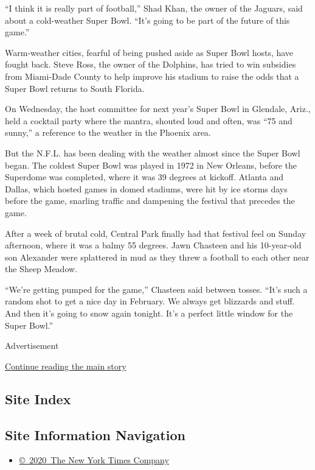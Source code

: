 ``I think it is really part of football,'' Shad Khan, the owner of the
Jaguars, said about a cold-weather Super Bowl. ``It's going to be part
of the future of this game.''

Warm-weather cities, fearful of being pushed aside as Super Bowl hosts,
have fought back. Steve Ross, the owner of the Dolphins, has tried to
win subsidies from Miami-Dade County to help improve his stadium to
raise the odds that a Super Bowl returns to South Florida.

On Wednesday, the host committee for next year's Super Bowl in Glendale,
Ariz., held a cocktail party where the mantra, shouted loud and often,
was ``75 and sunny,'' a reference to the weather in the Phoenix area.

But the N.F.L. has been dealing with the weather almost since the Super
Bowl began. The coldest Super Bowl was played in 1972 in New Orleans,
before the Superdome was completed, where it was 39 degrees at kickoff.
Atlanta and Dallas, which hosted games in domed stadiums, were hit by
ice storms days before the game, snarling traffic and dampening the
festival that precedes the game.

After a week of brutal cold, Central Park finally had that festival feel
on Sunday afternoon, where it was a balmy 55 degrees. Jawn Chasteen and
his 10-year-old son Alexander were splattered in mud as they threw a
football to each other near the Sheep Meadow.

``We're getting pumped for the game,'' Chasteen said between tosses.
``It's such a random shot to get a nice day in February. We always get
blizzards and stuff. And then it's going to snow again tonight. It's a
perfect little window for the Super Bowl.''

Advertisement

\protect\hyperlink{after-bottom}{Continue reading the main story}

\hypertarget{site-index}{%
\subsection{Site Index}\label{site-index}}

\hypertarget{site-information-navigation}{%
\subsection{Site Information
Navigation}\label{site-information-navigation}}

\begin{itemize}
\tightlist
\item
  \href{https://help.nytimes.com/hc/en-us/articles/115014792127-Copyright-notice}{©~2020~The
  New York Times Company}
\end{itemize}

